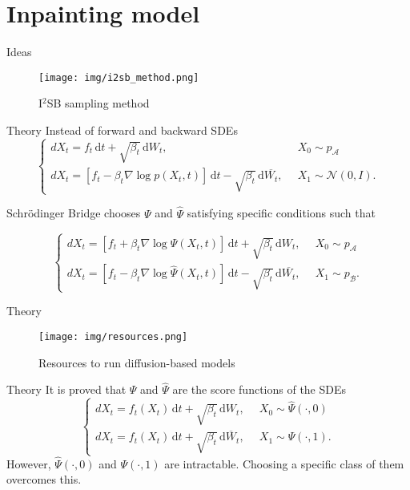 \section{Inpainting model}
\setcounter{footnote}{1} 

\begin{frame}{Ideas}
\begin{figure}
    \centering
    \texttt{[image: img/i2sb\_method.png]}
    \caption{I$^2$SB sampling method\footnotemark[1]}
    \label{fig:original}
\end{figure}
\end{frame}

\begin{frame}{Theory}
Instead of forward and backward SDEs
$$\begin{cases}
    dX_t = f_t\,\mathrm{d}t + \sqrt{\beta_t}\,\mathrm{d}W_t,&\,\,\, X_0\sim p_{\mathcal{A}}\\
    dX_t = [f_t - \beta_t\nabla\log p(X_t,t)]\,\mathrm{d}t-\sqrt{\beta_t}\,\mathrm{d}\overline{W_t},&\,\,\, X_1\sim \mathcal{N}(0,I).
\end{cases}$$

Schr\"odinger Bridge chooses $\Psi$ and $\hat{\Psi}$ satisfying specific conditions such that

$$\begin{cases}
    dX_t = [f_t + \beta_t\nabla\log\Psi(X_t,t)]\,\mathrm{d}t + \sqrt{\beta_t}\,\mathrm{d}W_t,&\,\,\, X_0\sim p_{\mathcal{A}}\\
    dX_t = [f_t - \beta_t\nabla\log\hat{\Psi}(X_t,t)]\,\mathrm{d}t-\sqrt{\beta_t}\,\mathrm{d}\overline{W_t},&\,\,\, X_1\sim p_{\mathcal{B}}.
\end{cases}$$
\end{frame}

\begin{frame}{Theory}
\begin{figure}
    \centering
    \texttt{[image: img/resources.png]}
    \caption{Resources to run diffusion-based models\footnotemark[1]}
    \label{fig:original}
\end{figure}
\end{frame}

\begin{frame}{Theory}
    It is proved that $\Psi$ and $\hat{\Psi}$ are the score functions of the SDEs
    $$\begin{cases}
        dX_t = f_t(X_t)\,\mathrm{d}t + \sqrt{\beta_t}\,\mathrm{d}W_t,&\,\,\, X_0\sim \hat{\Psi}(\cdot,0)\\
        dX_t = f_t(X_t)\,\mathrm{d}t + \sqrt{\beta_t}\,\mathrm{d}\overline{W}_t,&\,\,\, X_1\sim \Psi(\cdot,1).
    \end{cases}$$
However, $\hat{\Psi}(\cdot,0)$ and $\Psi(\cdot,1)$ are intractable. Choosing a specific class of them overcomes this.
\end{frame}

